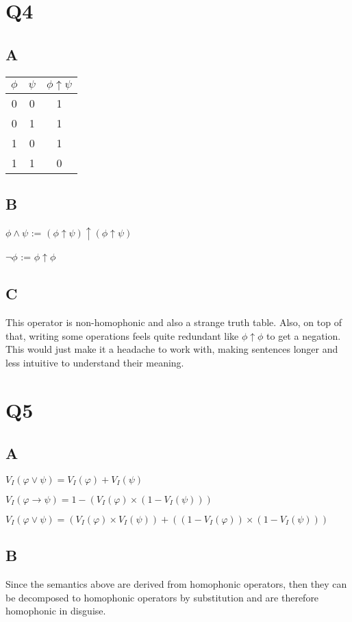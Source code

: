 \documentclass{article}
\begin{document}
\section*{Q4}
\subsection*{A}
\begin{tabular}{|c|c|c|}
\hline
$\phi$ & $\psi$ & $\phi \uparrow \psi$ \\ \hline
0 & 0 & 1 \\ \hline
0 & 1 & 1 \\ \hline
1 & 0 & 1 \\ \hline
1 & 1 & 0 \\ \hline
\end{tabular}

\subsection*{B}
\noindent $\phi \land \psi$ := $(\phi \uparrow \psi) \uparrow (\phi \uparrow \psi)$

\noindent $\lnot \phi$ := $\phi \uparrow \phi$

\subsection*{C}
This operator is non-homophonic and also a strange truth table. Also, on top of that,
writing some operations feels quite redundant like $\phi \uparrow \phi$ to get a negation.
This would just make it a headache to work with, making sentences longer and less intuitive
to understand their meaning.

\section*{Q5}
\subsection*{A}
\noindent $V_I(\varphi \lor \psi) = V_I(\varphi) + V_I(\psi)$

\noindent $V_I(\varphi \rightarrow \psi) = 1 - (V_I(\varphi) \times (1 - V_I(\psi)))$

\noindent $V_I(\varphi \lor \psi) = (V_I(\varphi) \times V_I(\psi)) + ((1 - V_I(\varphi)) \times (1 - V_I(\psi)))$

\subsection*{B}
Since the semantics above are derived from homophonic operators, then
they can be decomposed to homophonic operators by substitution and are therefore
homophonic in disguise. 
\end{document}
